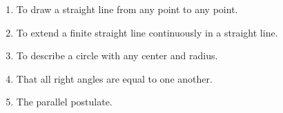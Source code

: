 \begin{frame}{}

  \begin{enumerate}[(1)]
    \item To draw a straight line from any point to any point.
    \item To extend a finite straight line continuously in a straight line.
    \item To describe a circle with any center and radius.
    \item That all right angles are equal to one another.
    \item The parallel postulate.
  \end{enumerate}
\end{frame}

\begin{frame}{}
  \begin{center}
  \end{center}
\end{frame}
